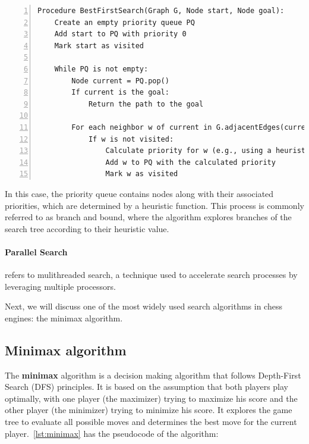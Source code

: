 \vspace{1em}

\begin{lstlisting}[caption={Pseudocode of the Best-First Search algorithm~\cite{Pearl1984}.}, frame=single, numbers=left, xleftmargin=10pt, breaklines=true, captionpos=b]
Procedure BestFirstSearch(Graph G, Node start, Node goal):
    Create an empty priority queue PQ
    Add start to PQ with priority 0
    Mark start as visited

    While PQ is not empty:
        Node current = PQ.pop()
        If current is the goal:
            Return the path to the goal

        For each neighbor w of current in G.adjacentEdges(current):
            If w is not visited:
                Calculate priority for w (e.g., using a heuristic)
                Add w to PQ with the calculated priority
                Mark w as visited
\end{lstlisting}

\vspace{1em}

\noindent In this case, the priority queue contains nodes along with their associated priorities, which are determined by a heuristic function. This process is commonly referred to as branch and bound, where the algorithm explores branches of the search tree according to their heuristic value.

\paragraph{Parallel Search} refers to mulithreaded search, a technique used to accelerate search processes by leveraging multiple processors.

\vspace{1em}

\noindent Next, we will discuss one of the most widely used search algorithms in chess engines: the minimax algorithm.

\subsection*{Minimax algorithm}\label{sec:minimax}

The \textbf{minimax} algorithm is a decision making algorithm that follows Depth-First Search (DFS) principles. It is based on the assumption that both players play optimally, with one player (the maximizer) trying to maximize his score and the other player (the minimizer) trying to minimize his score. It explores the game tree to evaluate all possible moves and determines the best move for the current player.~\cref{lst:minimax} has the pseudocode of the algorithm:

